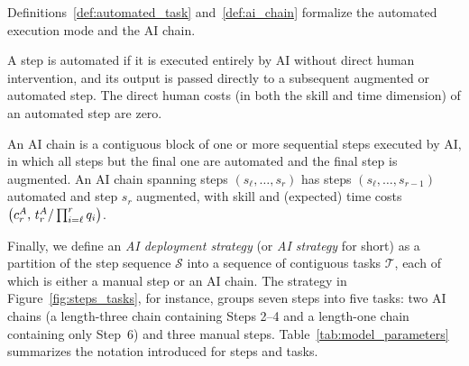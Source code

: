 Definitions~\ref{def:automated_task} and~\ref{def:ai_chain} formalize the automated execution mode and the AI chain.

\begin{definition}
\label{def:automated_task}
A step is automated if it is executed entirely by AI without direct human intervention, and its output is passed directly to a subsequent augmented or automated step.
The direct human costs (in both the skill and time dimension) of an automated step are zero.
\end{definition}

\begin{definition}[AI Chain]
\label{def:ai_chain}
An AI chain is a contiguous block of one or more sequential steps executed by AI, in which all steps but the final one are automated and the final step is augmented.
An AI chain spanning steps $(s_\ell,\dots,s_r)$ has steps $(s_\ell,\dots,s_{r-1})$ automated and step $s_r$ augmented, with skill and (expected) time costs $\left(c^{A}_{r},\, t^{A}_{r}/\prod_{i=\ell}^{r} q_i\right)$.
\end{definition}

Finally, we define an \emph{AI deployment strategy} (or \emph{AI strategy} for short) as a partition of the step sequence $\mathcal{S}$ into a sequence of contiguous tasks $\mathcal{T}$, each of which is either a manual step or an AI chain.
The strategy in Figure~\ref{fig:steps_tasks}, for instance, groups seven steps into five tasks: two AI chains (a length-three chain containing Steps 2--4 and a length-one chain containing only Step~6) and three manual steps.
Table~\ref{tab:model_parameters} summarizes the notation introduced for steps and tasks.

